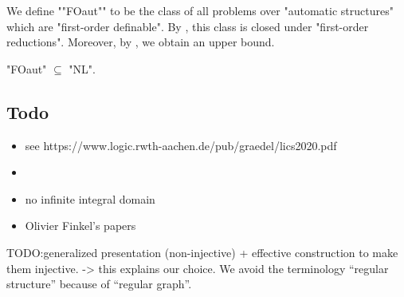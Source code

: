 We define \AP""FOaut"" to be the class of all problems over "automatic structures"
which are "first-order definable". By ,
this class is closed under "first-order reductions". Moreover,
by , we obtain an upper bound.

\begin{proposition}
	"FOaut" $\subseteq$ "NL".
\end{proposition}

\subsection{Todo}

\begin{itemize}
	\itemAP ""automatic graph""
	\item see https://www.logic.rwth-aachen.de/pub/graedel/lics2020.pdf
	\item \cite[\S~6]{KhoussainovNerode1995AutomaticPresentations}
	\item no infinite integral domain \cite{KhoussainovNiesRubinStephan2007Automatic}
	\item Olivier Finkel's papers
\end{itemize}

TODO:generalized presentation (non-injective) + effective construction to make them injective.
-> this explains our choice. We avoid the terminology ``regular structure'' because of
``regular graph''.
